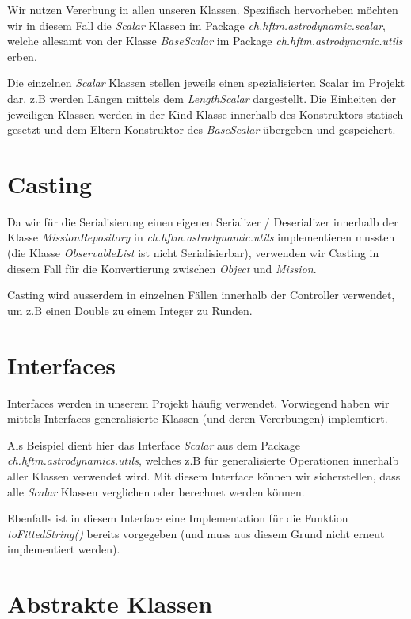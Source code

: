 Wir nutzen Vererbung in allen unseren Klassen. Spezifisch hervorheben möchten wir in diesem Fall die \textit{Scalar} Klassen im Package \textit{ch.hftm.astrodynamic.scalar}, welche allesamt von der Klasse \textit{BaseScalar} im Package \textit{ch.hftm.astrodynamic.utils} erben.

Die einzelnen \textit{Scalar} Klassen stellen jeweils einen spezialisierten Scalar im Projekt dar. z.B werden Längen mittels dem \textit{LengthScalar} dargestellt.
Die Einheiten der jeweiligen Klassen werden in der Kind-Klasse innerhalb des Konstruktors statisch gesetzt und dem Eltern-Konstruktor des \textit{BaseScalar} übergeben und gespeichert.

\section{Casting}

Da wir für die Serialisierung einen eigenen Serializer / Deserializer innerhalb der Klasse \textit{MissionRepository} in \textit{ch.hftm.astrodynamic.utils} implementieren mussten (die Klasse \textit{ObservableList} ist nicht Serialisierbar), verwenden wir Casting in diesem Fall für die Konvertierung zwischen \textit{Object} und \textit{Mission}.

Casting wird ausserdem in einzelnen Fällen innerhalb der Controller verwendet, um z.B einen Double zu einem Integer zu Runden.

\section{Interfaces}

Interfaces werden in unserem Projekt häufig verwendet. Vorwiegend haben wir mittels Interfaces generalisierte Klassen (und deren Vererbungen) implemtiert.

Als Beispiel dient hier das Interface \textit{Scalar} aus dem Package \textit{ch.hftm.astrodynamics.utils}, welches z.B für generalisierte Operationen innerhalb aller Klassen verwendet wird. Mit diesem Interface können wir sicherstellen, dass alle \textit{Scalar} Klassen verglichen oder berechnet werden können.

Ebenfalls ist in diesem Interface eine Implementation für die Funktion \textit{toFittedString()} bereits vorgegeben (und muss aus diesem Grund nicht erneut implementiert werden).

\section{Abstrakte Klassen}

